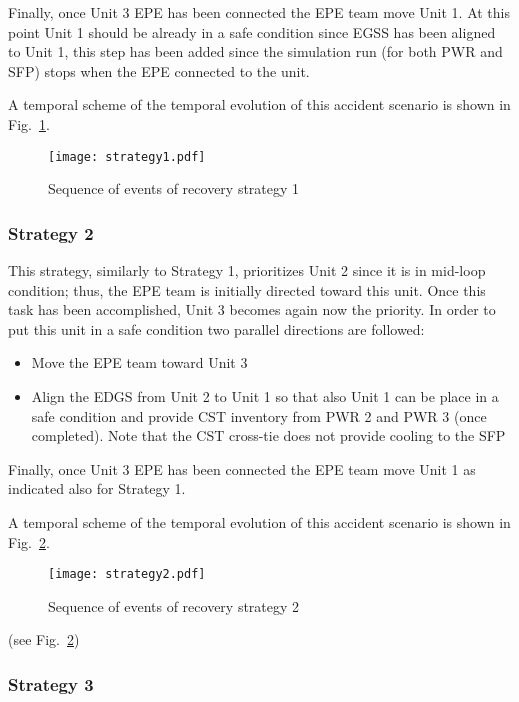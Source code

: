 Finally, once Unit 3 EPE has been connected the EPE team move Unit 1. At this point Unit 1 should be already in a 
safe condition since EGSS has been aligned to Unit 1, this step has been added since the simulation run (for 
both PWR and SFP) stops when the EPE connected to the unit.

A temporal scheme of the temporal evolution of this accident scenario is shown in Fig.~\ref{fig:strategy1Scheme}.   

\begin{figure}
    \centering
    \centerline{\texttt{[image: strategy1.pdf]}}
    \caption{Sequence of events of recovery strategy 1}
    \label{fig:strategy1Scheme}
\end{figure}

\subsubsection{Strategy 2}
\label{sec:strategy2}

This strategy, similarly to Strategy 1, prioritizes Unit 2 since it is in mid-loop condition; thus, the EPE 
team is initially directed toward this unit. 
Once this task has been accomplished, Unit 3 becomes again now the priority. In order to put this unit in a safe 
condition two parallel directions are followed:

\begin{itemize}
  \item Move the EPE team toward Unit 3 
  \item Align the EDGS from Unit 2 to Unit 1 so that also Unit 1 can be place in a safe condition and provide 
        CST inventory from PWR 2 and PWR 3 (once completed). Note that the CST cross-tie does not provide cooling 
        to the SFP
\end{itemize}

Finally, once Unit 3 EPE has been connected the EPE team move Unit 1 as indicated also for Strategy 1.

A temporal scheme of the temporal evolution of this accident scenario is shown in Fig.~\ref{fig:strategy2Scheme}.  

\begin{figure}
    \centering
    \centerline{\texttt{[image: strategy2.pdf]}}
    \caption{Sequence of events of recovery strategy 2}
    \label{fig:strategy2Scheme}
\end{figure}
(see Fig.~\ref{fig:strategy2Scheme})


\subsubsection{Strategy 3}
\label{sec:strategy3}

